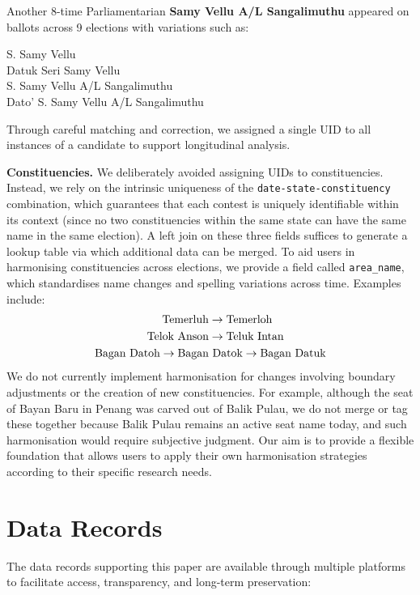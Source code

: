 \documentclass[11pt]{article}
\begin{document}
Another 8-time Parliamentarian \textbf{Samy Vellu A/L Sangalimuthu} appeared on ballots across 9 elections with variations such as:

\begin{centering}

S. Samy Vellu\\
Datuk Seri Samy Vellu\\
S. Samy Vellu A/L Sangalimuthu\\
Dato' S. Samy Vellu A/L Sangalimuthu

\end{centering}
Through careful matching and correction, we assigned a single UID to all instances of a candidate to support longitudinal analysis.

\textbf{Constituencies.}
We deliberately avoided assigning UIDs to constituencies. Instead, we rely on the intrinsic uniqueness of the \texttt{date-state-constituency} combination, which guarantees that each contest is uniquely identifiable within its context (since no two constituencies within the same state can have the same name in the same election). A left join on these three fields suffices to generate a lookup table via which additional data can be merged. To aid users in harmonising constituencies across elections, we provide a field called \texttt{area\_name}, which standardises name changes and spelling variations across time. Examples include:
\begin{align*}
\text{Temerluh} &\rightarrow \space \text{Temerloh}\\ 
\text{Telok Anson} &\rightarrow \space \text{Teluk Intan}\\
\text{Bagan Datoh} \rightarrow \space \text{Bagan}&\text{ }\text{Datok} \rightarrow \space \text{Bagan Datuk}
\end{align*}
We do not currently implement harmonisation for changes involving boundary adjustments or the creation of new constituencies. For example, although the seat of Bayan Baru in Penang was carved out of Balik Pulau, we do not merge or tag these together because Balik Pulau remains an active seat name today, and such harmonisation would require subjective judgment. Our aim is to provide a flexible foundation that allows users to apply their own harmonisation strategies according to their specific research needs.

\section*{Data Records}
The data records supporting this paper are available through multiple platforms to facilitate access, transparency, and long-term preservation:
\end{document}
